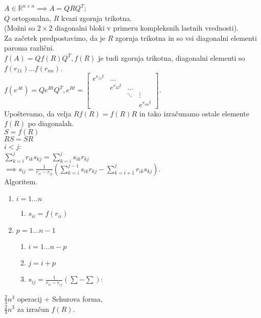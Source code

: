 \documentclass[a4paper, 12pt]{book}
\theoremstyle{definition}
\theoremstyle{remark}
\newcommand{\R}{\mathbb{R}}
\begin{document}
$A \in \R^{n \times n} \implies A = Q R Q^T$; \\
$Q$ ortogonalna, $R$ kvazi zgornja trikotna. \\
(Možni so $2 \times 2$ diagonalni bloki v primeru kompleksnih lastnih vrednosti). \\
Za začetek predpostavimo, da je $R$ zgornja trikotna in so vsi diagonalni elementi paroma različni. \\
$f(A) = Q f(R) Q^T, f(R)$ je tudi zgornja trikotna, diagonalni elementi so $f(r_{11}) \dots f(r_{nn})$. \\
$f(e^{At}) = Q e^{Rt} Q^T, e^{Rt} = \begin{bmatrix}
    e^{r_{11} t} & \dots & & \\
    & e^{r_{22} t} & \dots & \\
    & & \ddots & \vdots \\
    & & & e^{r_{nn} t}
\end{bmatrix}$. \\
Upoštevamo, da velja $R f(R) = f(R) R$ in tako izračunamo ostale elemente $f(R)$ po diagonalah. \\
$S = f(R)$ \\
$RS = SR$ \\
$i < j$: \\
$\sum_{k=i}^j r_{ik} s_{kj} = \sum_{k=i}^j s_{ik} r_{kj}$ \\
$\implies s_{ij} = \frac{1}{r_{ii} - r_{ij}} \left(\sum_{k=i}^{j-1} s_{ik} r_{kj} - \sum_{k=i+1}^{j} r_{ik} s_{kj} \right)$. \\
Algoritem.
\begin{enumerate}[label={}]
    \item $i = 1 \dots n$
    \begin{enumerate}[label={}]
        \item $s_{ii} = f(r_{ii})$
    \end{enumerate}
    \item $p = 1 \dots n-1$
    \begin{enumerate}[label={}]
        \item $i = 1 \dots n-p$
        \item $j = i+p$
        \item $s_{ij} = \frac{1}{r_{ii} - r_{ij}} \left( \sum - \sum \right)$:
    \end{enumerate}
\end{enumerate}
$\frac{2}{3} n^3$ operacij + Schurova forma, \\
$\frac{2}{3} n^3$ za izračun $f(R)$. \\
\end{document}
